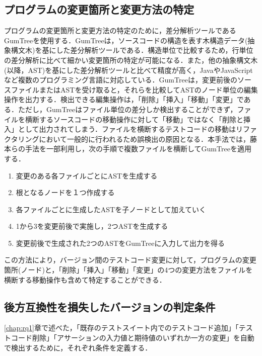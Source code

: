 \documentclass[submit]{ipsj}
\begin{document}
\subsection{プログラムの変更箇所と変更方法の特定}\label{subsec:rq2.astseisei}
プログラムの変更箇所と変更方法の特定のために，差分解析ツールであるGumTree\cite{gumtree}を使用する．GumTreeは，ソースコードの構造を表す木構造データ(抽象構文木)を基にした差分解析ツールである．構造単位で比較するため，行単位の差分解析に比べて細かい変更箇所の特定が可能になる．また，他の抽象構文木(以降，AST)を基にした差分解析ツール\cite{diff-1}\cite{diff-2}\cite{diff-3}と比べて精度が高く，JavaやJavaScriptなど複数のプログラミング言語に対応している．GumTreeは，変更前後のソースファイルまたはASTを受け取ると，それらを比較してASTのノード単位の編集操作を出力する．検出できる編集操作は，「削除」「挿入」「移動」「変更」である．ただし，GumTreeはファイル単位の差分しか検出することができず，ファイルを横断するソースコードの移動操作に対して「移動」ではなく「削除と挿入」として出力されてしまう．ファイルを横断するテストコードの移動はリファクタリングにおいて一般的に行われるため誤検出の原因となる．本手法では，藤本らの手法\cite{gumtreenoyatu}を一部利用し，次の手順で複数ファイルを横断してGumTreeを適用する．

\begin{enumerate}
  \setlength{\itemsep}{0cm}
  \item 変更のある各ファイルごとにASTを生成する
  \item 根となるノードを１つ作成する
  \item 各ファイルごとに生成したASTを子ノードとして加えていく
  \item 1から3を変更前後で実施し，2つASTを生成する
  \item 変更前後で生成された2つのASTをGumTreeに入力して出力を得る
\end{enumerate}

この方法により，バージョン間のテストコード変更に対して，プログラムの変更箇所(ノード)と，「削除」「挿入」「移動」「変更」の4つの変更方法をファイルを横断する移動操作も含めて特定することができる．

\subsection{後方互換性を損失したバージョンの判定条件}\label{subsec:rq2.jouken}
\ref{chap:rq1}章で述べた，「既存のテストスイート内でのテストコード追加」「テストコード削除」「アサーションの入力値と期待値のいずれか一方の変更」を自動で検出するために，それぞれ条件を定義する．
\end{document}
